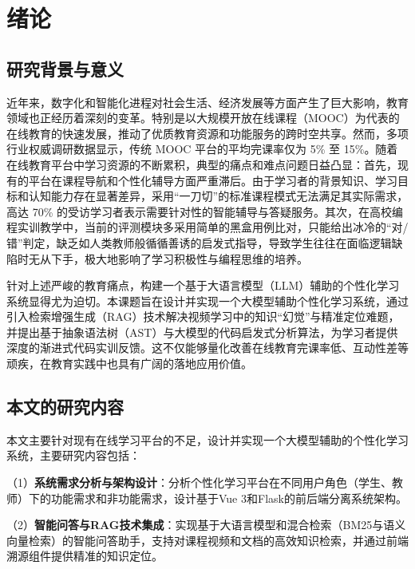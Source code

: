 \chapter{绪论}

\section{研究背景与意义}

近年来，数字化和智能化进程对社会生活、经济发展等方面产生了巨大影响，教育领域也正经历着深刻的变革。特别是以大规模开放在线课程（MOOC）为代表的在线教育的快速发展，推动了优质教育资源和功能服务的跨时空共享。然而，多项行业权威调研数据显示，传统 MOOC 平台的平均完课率仅为 5\% 至 15\%\cite{whu-bachelor:1}。随着在线教育平台中学习资源的不断累积，典型的痛点和难点问题日益凸显：首先，现有的平台在课程导航和个性化辅导方面严重滞后。由于学习者的背景知识、学习目标和认知能力存在显著差异，采用“一刀切”的标准课程模式无法满足其实际需求，高达 70\% 的受访学习者表示需要针对性的智能辅导与答疑服务\cite{whu-bachelor:2}。其次，在高校编程实训教学中，当前的评测模块多采用简单的黑盒用例比对，只能给出冰冷的“对/错”判定，缺乏如人类教师般循循善诱的启发式指导，导致学生往往在面临逻辑缺陷时无从下手，极大地影响了学习积极性与编程思维的培养。

针对上述严峻的教育痛点，构建一个基于大语言模型（LLM）\cite{whu-bachelor:7,whu-bachelor:9,whu-bachelor:11}辅助的个性化学习系统显得尤为迫切。本课题旨在设计并实现一个大模型辅助个性化学习系统，通过引入检索增强生成（RAG）技术\cite{whu-bachelor:8}解决视频学习中的知识“幻觉”与精准定位难题，并提出基于抽象语法树（AST）与大模型的代码启发式分析算法\cite{whu-bachelor:10}，为学习者提供深度的渐进式代码实训反馈。这不仅能够量化改善在线教育完课率低、互动性差等顽疾，在教育实践中也具有广阔的落地应用价值。

\section{本文的研究内容}

本文主要针对现有在线学习平台的不足，设计并实现一个大模型辅助的个性化学习系统，主要研究内容包括：

（1）\textbf{系统需求分析与架构设计}：分析个性化学习平台在不同用户角色（学生、教师）下的功能需求和非功能需求，设计基于Vue 3和Flask的前后端分离系统架构\cite{whu-bachelor:24,whu-bachelor:25}。

（2）\textbf{智能问答与RAG技术集成}：实现基于大语言模型和混合检索（BM25与语义向量检索）的智能问答助手，支持对课程视频和文档的高效知识检索，并通过前端溯源组件提供精准的知识定位\cite{whu-bachelor:27}。

